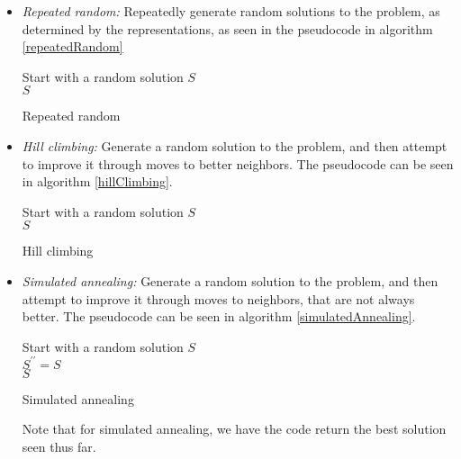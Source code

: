 \documentclass[tikz, 12pt]{scrartcl}
\begin{document}
\begin{itemize}
	\item \textit{Repeated random:} Repeatedly generate random solutions to the problem, as determined by the representations, as seen in the pseudocode in algorithm \ref{repeatedRandom}
	
	\begin{algorithm}[th!]
	Start with a random solution $S$\\
	\Return $S$
\caption{Repeated random}
\label{repeatedRandom}
\end{algorithm}

\item \textit{Hill climbing:} Generate a random solution to the problem, and then attempt to improve it through moves to better neighbors. The pseudocode can be seen in algorithm \ref{hillClimbing}.

	\begin{algorithm}[th!]
	Start with a random solution $S$\\
	\Return $S$
\caption{Hill climbing}
\label{hillClimbing}
\end{algorithm}

\item \textit{Simulated annealing:} Generate a random solution to the problem, and then attempt to improve it through moves to neighbors, that are not always better. The pseudocode can be seen in algorithm \ref{simulatedAnnealing}.

	\begin{algorithm}[th!]
	Start with a random solution $S$\\
	$S^{\prime \prime} = S$\\
	\Return $S$
\caption{Simulated annealing}
\label{simulatedAnnealing}
\end{algorithm}

Note that for simulated annealing, we have the code return the best solution seen thus far.
\end{itemize}
\end{document}
